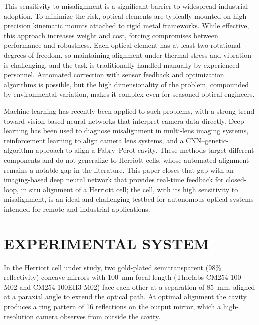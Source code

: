 \documentclass[]{spie}  %
\begin{document}
This sensitivity to misalignment is a significant barrier to widespread industrial adoption. To minimize the risk, optical elements are typically mounted on high-precision kinematic mounts attached to rigid metal frameworks.\cite{yoder} While effective, this approach increases weight and cost, forcing compromises between performance and robustness. Each optical element has at least two rotational degrees of freedom, so maintaining alignment under thermal stress and vibration is challenging, and the task is traditionally handled manually by experienced personnel. Automated correction with sensor feedback and optimization algorithms is possible, but the high dimensionality of the problem, compounded by environmental variation, makes it complex even for seasoned optical engineers.\cite{RAKHMATULIN2024107923}

Machine learning has recently been applied to such problems, with a strong trend toward vision-based neural networks that interpret camera data directly. Deep learning has been used to diagnose misalignment in multi-lens imaging systems,\cite{slor2025deeplearningopticalmisalignment} reinforcement learning to align camera lens systems,\cite{burkhardt2025activealignmentslenssystems} and a CNN--genetic-algorithm approach to align a Fabry--P\'{e}rot cavity.\cite{qin2025automated} These methods target different components and do not generalize to Herriott cells, whose automated alignment remains a notable gap in the literature. This paper closes that gap with an imaging-based deep neural network that provides real-time feedback for closed-loop, in situ alignment of a Herriott cell; the cell, with its high sensitivity to misalignment, is an ideal and challenging testbed for autonomous optical systems intended for remote and industrial applications.

\section{EXPERIMENTAL SYSTEM}
\label{sec:system}

In the Herriott cell under study, two gold-plated semitransparent (98\% reflectivity) concave mirrors with 100~mm focal length (Thorlabs CM254-100-M02 and CM254-100EH3-M02) face each other at a separation of 85~mm, aligned at a paraxial angle to extend the optical path. At optimal alignment the cavity produces a ring pattern of 16 reflections on the output mirror, which a high-resolution camera observes from outside the cavity.
\end{document}
